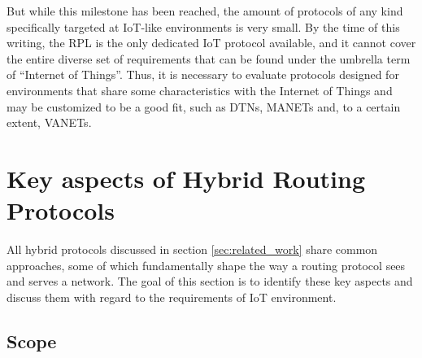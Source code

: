 \documentclass[a4paper,10pt]{scrartcl}
\begin{document}
But while this milestone has been reached, the amount of protocols of any kind specifically targeted at IoT-like environments is very small. By the time of this writing, the \gls{RPL} is the only dedicated IoT protocol available, and it cannot cover the entire diverse set of requirements that can be found under the umbrella term of ``Internet of Things''. Thus, it is necessary to evaluate protocols designed for environments that share some characteristics with the Internet of Things and may be customized to be a good fit, such as \glspl{DTN}, \glspl{MANET} and, to a certain extent, \glspl{VANET}.\\

\section{Key aspects of Hybrid Routing Protocols}
\label{sec:key_aspects}
All hybrid protocols discussed in section \ref{sec:related_work} share common approaches, some of which fundamentally shape the way a routing protocol sees and serves a network. The goal of this section is to identify these key aspects and discuss them with regard to the requirements of IoT environment.

\subsection{Scope}
\label{subsec:scope}
\end{document}
